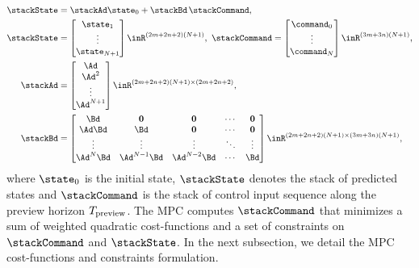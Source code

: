\begin{align}
	\label{eq:MPC system model}\stackState &= \stackAd\state_0 + \stackBd\hspace{0.05cm}\stackCommand, \\ 
	\stackState &= \begin{bmatrix}
		\state_{1} \\ \vdots \\ \state_{N+1}
	\end{bmatrix}\inR^{(2m + 2n+2)(N+1)}, \ \stackCommand = \begin{bmatrix}
	\command_0 \\ \vdots \\ \command_{N}
\end{bmatrix} \inR^{(3m+3n)(N+1)}, \\
	\stackAd&= \begin{bmatrix}
		\Ad   \\ 
		\Ad^2 \\
		\vdots  \\
		\Ad^{N+1}  
	\end{bmatrix}\inR^{(2m+2n+2)(N+1)\times (2m+2n+2)}, \\ 
		\stackBd&= \begin{bmatrix}
		\Bd         & \mathbf{0}   	& \mathbf{0}  & \cdots & \mathbf{0}  \\ 
		\Ad\Bd      & \Bd 	        & \mathbf{0}  & \cdots & \mathbf{0}  \\
		\vdots      &  \vdots      	& \vdots	  & \ddots &  \vdots  \\
		\Ad^{N}\Bd  & \Ad^{N-1}\Bd  & \Ad^{N-2}\Bd& \cdots &\Bd
	\end{bmatrix}\inR^{(2m+2n+2)(N+1)\times (3m+3n)(N+1)},
\end{align}
where $\state_0$ is the initial state, $\stackState$ denotes the stack of predicted states and $\stackCommand$ is the stack of control input sequence along the preview horizon $T_{\rm preview}$. The MPC  computes $\stackCommand$ that minimizes a sum of weighted quadratic cost-functions and a set of constraints on $\stackCommand$ and $\stackState$. In the next subsection, we  detail the MPC cost-functions and constraints formulation. 
